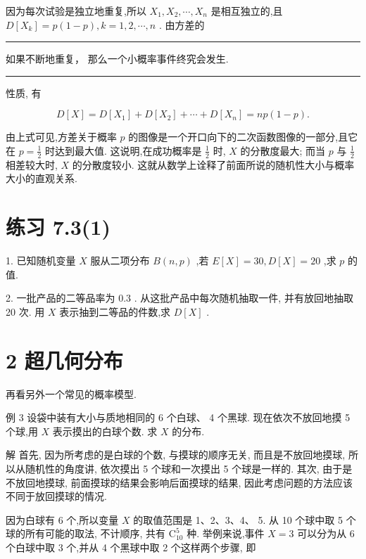 \documentclass[10pt]{article}
\newcommand{\HRule}{\begin{center}\rule{0.9\linewidth}{0.2mm}\end{center}}
\begin{document}
因为每次试验是独立地重复,所以 \({X}_{1},{X}_{2},\cdots ,{X}_{n}\) 是相互独立的,且 \(D\left\lbrack  {X}_{k}\right\rbrack   = p\left( {1 - p}\right) ,k = 1,2,\cdots ,n\) . 由方差的



\HRule

如果不断地重复， 那么一个小概率事件终究会发生.

\HRule

性质, 有

\[
D\left\lbrack  X\right\rbrack   = D\left\lbrack  {X}_{1}\right\rbrack   + D\left\lbrack  {X}_{2}\right\rbrack   + \cdots  + D\left\lbrack  {X}_{n}\right\rbrack   = {np}\left( {1 - p}\right) .
\]

由上式可见,方差关于概率 \(p\) 的图像是一个开口向下的二次函数图像的一部分,且它在 \(p = \frac{1}{2}\) 时达到最大值. 这说明,在成功概率是 \(\frac{1}{2}\) 时, \(X\) 的分散度最大; 而当 \(p\) 与 \(\frac{1}{2}\) 相差较大时, \(X\) 的分散度较小. 这就从数学上诠释了前面所说的随机性大小与概率大小的直观关系.

\section*{练习 7.3(1)}

1. 已知随机变量 \(X\) 服从二项分布 \(B\left( {n,p}\right)\) ,若 \(E\left\lbrack  X\right\rbrack   = {30},D\left\lbrack  X\right\rbrack   = {20}\) ,求 \(p\) 的值.

2. 一批产品的二等品率为 0.3 . 从这批产品中每次随机抽取一件, 并有放回地抽取 20 次. 用 \(X\) 表示抽到二等品的件数,求 \(D\left\lbrack  X\right\rbrack\) .

\section*{2 超几何分布}

再看另外一个常见的概率模型.

例 3 设袋中装有大小与质地相同的 6 个白球、 4 个黑球. 现在依次不放回地摸 5 个球,用 \(X\) 表示摸出的白球个数. 求 \(X\) 的分布.

解 首先, 因为所考虑的是白球的个数, 与摸球的顺序无关, 而且是不放回地摸球, 所以从随机性的角度讲, 依次摸出 5 个球和一次摸出 5 个球是一样的. 其次, 由于是不放回地摸球, 前面摸球的结果会影响后面摸球的结果, 因此考虑问题的方法应该不同于放回摸球的情况.

因为白球有 6 个,所以变量 \(X\) 的取值范围是 1、2、3、4、 5. 从 10 个球中取 5 个球的所有可能的取法, 不计顺序, 共有 \({\mathrm{C}}_{10}^{5}\) 种. 举例来说,事件 \(X = 3\) 可以分为从 6 个白球中取 3 个,并从 4 个黑球中取 2 个这样两个步骤, 即
\end{document}
